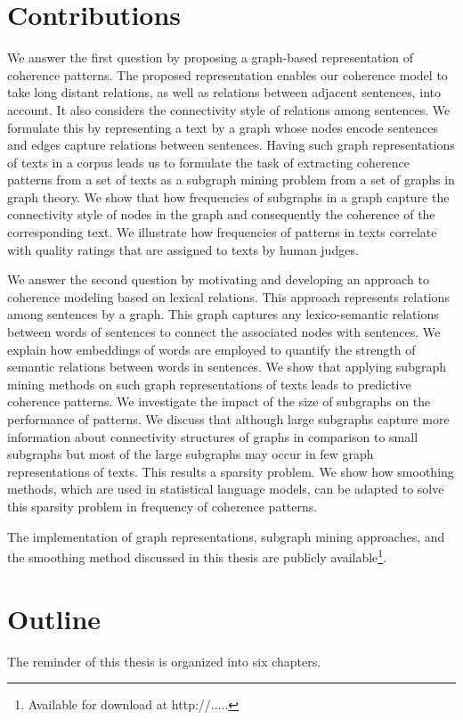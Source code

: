 \section{Contributions}
\label{sec:intro-contributions}

We answer the first question by proposing a graph-based representation of coherence patterns. 
The proposed representation enables our coherence model to take long distant relations, as well as relations between adjacent sentences,  into account. 
It also considers the connectivity style of relations among sentences. 
We formulate this by representing a text by a graph whose nodes encode sentences and edges capture relations between sentences. 
Having such graph representations of texts in a corpus leads us to formulate the task of extracting coherence patterns from a set of texts as a subgraph mining problem from a set of graphs in graph theory. 
We show that how frequencies of subgraphs in a graph capture the connectivity style of nodes in the graph and consequently the coherence of the corresponding text. 
We illustrate how frequencies of patterns in texts correlate with quality ratings that are assigned to texts by human judges. 

We answer the second question by motivating and developing an approach to coherence modeling based on lexical relations. 
This approach represents relations among sentences by a graph. 
This graph captures any lexico-semantic relations between words of sentences to connect the associated nodes with sentences. 
We explain how embeddings of words are employed to quantify the strength of semantic relations between words in sentences. 
We show that applying subgraph mining methods on such graph representations of texts leads to  predictive coherence patterns. 
We investigate the impact of the size of subgraphs on the performance of patterns. 
We discuss that although large subgraphs capture more information about connectivity structures of graphs in comparison to small subgraphs but most of the large subgraphs may occur in few graph representations of texts.  
This results a sparsity problem. 
We show how smoothing methods, which are used in statistical language models, can be adapted to solve this sparsity problem in frequency of coherence patterns. 

The implementation of graph representations, subgraph mining approaches, and the smoothing method discussed in this thesis are publicly available\footnote{Available for download at http://.....}. 


\section{Outline}
\label{sec:intro-outline}
The reminder of this thesis is organized into six chapters. 

